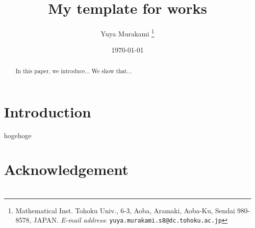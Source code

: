 \documentclass[11pt,a4paper,oneside,lualatex]{article}
\begin{document}

\title{My template for works}
\author{Yuya Murakami
\thanks{Mathematical Inst. Tohoku Univ., 6-3, Aoba, Aramaki, Aoba-Ku, Sendai 980-8578, JAPAN.
	\textit{E-mail address}: \texttt{yuya.murakami.s8@dc.tohoku.ac.jp}}}
\date{\today}

\maketitle

\tableofcontents


\begin{abstract}
	In this paper, we introduce...
	We show that...
\end{abstract}


\section{Introduction} \label{sec:intro}


\begin{thm} \label{thm:main}
	hogehoge
\end{thm}



\section*{Acknowledgement} \label{sec:acknowledgement}




\section{} \label{sec:}





%
%

\end{document}
